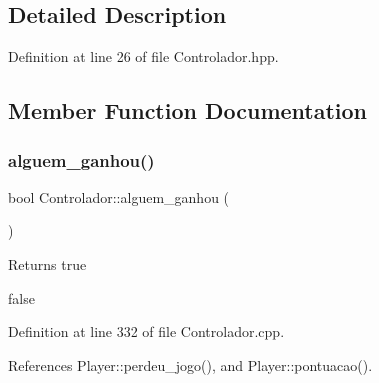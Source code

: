 \subsection{Detailed Description}


Definition at line 26 of file Controlador.\+hpp.



\subsection{Member Function Documentation}
\mbox{\label{class_controlador_ad7e1f4e5dc199d9499cf1896c3f4fdf1}} 
\subsubsection{\texorpdfstring{alguem\+\_\+ganhou()}{alguem\_ganhou()}}
{\footnotesize\ttfamily bool Controlador\+::alguem\+\_\+ganhou (\begin{DoxyParamCaption}{ }\end{DoxyParamCaption})}

\begin{DoxyReturn}{Returns}
true 

false 
\end{DoxyReturn}


Definition at line 332 of file Controlador.\+cpp.



References Player\+::perdeu\+\_\+jogo(), and Player\+::pontuacao().


